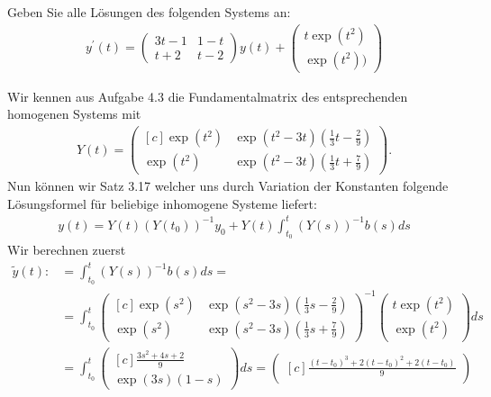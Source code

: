 \begin{exercise}
Geben Sie alle Lösungen des folgenden Systems an:
\begin{align*}
  y^{\prime}(t) = \begin{pmatrix}
    3t -1 & 1 - t \\ t + 2 & t - 2
  \end{pmatrix}
  y(t) +
  \begin{pmatrix}
    t\exp(t^2) \\ \exp(t^2))
  \end{pmatrix}
\end{align*}
\end{exercise}
\begin{solution}
Wir kennen aus Aufgabe 4.3 die Fundamentalmatrix des entsprechenden homogenen Systems mit
\begin{align*}
Y(t) = \begin{pmatrix*}[c]
  \exp(t^2) & \exp(t^2-3t)(\frac{1}{3}t - \frac{2}{9}) \\
  \exp(t^2) & \exp(t^2-3t)(\frac{1}{3}t + \frac{7}{9})
\end{pmatrix*}.
\end{align*}
Nun können wir Satz 3.17 welcher uns durch Variation der Konstanten folgende
Lösungsformel für beliebige inhomogene Systeme liefert:
\begin{align*}
  y(t) = Y(t)(Y(t_0))^{-1}y_0 + Y(t)\int_{t_0}^{t}(Y(s))^{-1}b(s)ds
\end{align*}
Wir berechnen zuerst
\begin{align*}
  \tilde{y}(t) :&= \int_{t_0}^{t}(Y(s))^{-1}b(s)ds = \\
  &= 
  \int_{t_0}^{t}  \begin{pmatrix*}[c]
      \exp(s^2) & \exp(s^2-3s)(\frac{1}{3}s - \frac{2}{9}) \\
      \exp(s^2) & \exp(s^2-3s)(\frac{1}{3}s + \frac{7}{9})
    \end{pmatrix*}^{-1}
    \begin{pmatrix}
      t\exp(t^2) \\ \exp(t^2)
    \end{pmatrix}ds \\
    & = \int_{t_0}^{t}  \begin{pmatrix*}[c]
      \frac{3s^2 + 4s + 2}{9} \\
      \exp(3s)(1 - s)
    \end{pmatrix*}ds = \begin{pmatrix*}[c]
      \frac{(t-t_0)^3 + 2(t-t_0)^2 + 2(t-t_0)}{9} \\

\end{pmatrix*}
\end{align*}
\end{solution}
